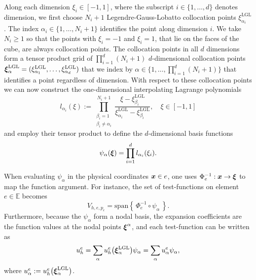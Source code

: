 Along each dimension $\xi_i\in[-1,1]$, where the subscript
  $i\in\{1,\ldots,d\}$ denotes dimension, we first choose
$N_i + 1$ Legendre-Gauss-Lobatto collocation points
  $\xi^\mathrm{LGL}_{\alpha_i}$. The index
  $\alpha_i\in\{1,\ldots,N_i+1\}$ identifies the point along dimension
  $i$. We take $N_i\geq 1$ so that the points with $\xi_i=-1$ and
  $\xi_i=1$, that lie on the faces of the cube, are always collocation
  points. The collocation points in all $d$ dimensions form a tensor
  product grid of $\prod_{i=1}^d (N_i + 1)$ $d$-dimensional
  collocation points
  $\boldsymbol{\xi}^\mathrm{LGL}_\alpha=(\xi^\mathrm{LGL}_{\alpha_1},\ldots,\xi^\mathrm{LGL}_{\alpha_d})$
  that we index by $\alpha\in\{1,\ldots,\prod_{i=1}^d (N_i + 1)\}$
  that identifies a point regardless of dimension. With respect to
  these collocation points we can now construct the one-dimensional
  interpolating Lagrange polynomials
\begin{equation}
  l_{\alpha_i}(\xi) := \prod_{\substack{\beta_i=1\\\beta_i\neq\alpha_i}}^{N_i+1} \frac{\xi-\xi^\mathrm{LGL}_{\beta_i}}{\xi^\mathrm{LGL}_{\alpha_i} - \xi^\mathrm{LGL}_{\beta_i}}, \quad \xi\in[-1,1]
\end{equation}
and employ their tensor product to define the $d$-dimensional basis functions
\begin{equation}
\label{eq:Lagrange_Basis}
\psi_\alpha(\boldsymbol{\xi}) = \prod_{i=1}^d l_{\alpha_i}(\xi_i) \text{.}
\end{equation}


    When evaluating $\psi_\alpha$ in the physical coordinates $\boldsymbol{x}\in e$, one uses $\Phi_e^{-1}:\boldsymbol{x}\to \boldsymbol{\xi}$ to map the function argument. For instance, the set of test-functions on element $e\in \mathbb{E}$ becomes
  \begin{equation}
  V_{h,e,p_e}=\mbox{span}\left\{\,\Phi_e^{-1}\circ\psi_\alpha\,\right\}.
  \end{equation}
  Furthermore, because the $\psi_\alpha$ form a nodal basis, the expansion coefficients are the function values at the nodal points $\boldsymbol{\xi}^\alpha$, and each test-function can be written as
  \begin{equation}
    u^e_h = \sum_{\alpha}u^e_h\big(\boldsymbol{\xi}_\alpha^{\textrm{LGL}}\big)\psi_\alpha = \sum_{\alpha}u^e_\alpha\psi_\alpha,
    \end{equation}
where $u^e_\alpha:= u^e_h\big(\boldsymbol{\xi}_\alpha^{\textrm{LGL}}\big)$.
